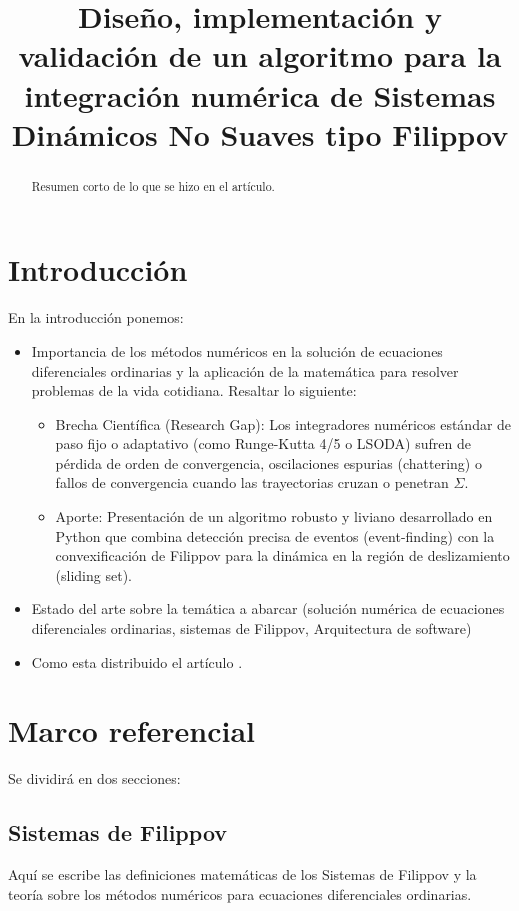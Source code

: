 \documentclass[12pt,letterpaper]{article}
\title{Diseño, implementación y validación de un algoritmo para la integración numérica de Sistemas Dinámicos No Suaves tipo Filippov }
\date{}
\begin{document}
\maketitle

\begin{abstract}
    Resumen corto de lo que se hizo en el artículo.
\end{abstract}

\section{Introducción}
En la introducción ponemos:
\begin{itemize}
    \item Importancia de los métodos numéricos en la solución de ecuaciones diferenciales ordinarias y la aplicación de la matemática para resolver problemas de la vida cotidiana. Resaltar lo siguiente:
    \begin{itemize}
        \item Brecha Científica (Research Gap): Los integradores numéricos estándar de paso fijo o adaptativo (como Runge-Kutta 4/5 o LSODA) sufren de pérdida de orden de convergencia, oscilaciones espurias (chattering) o fallos de convergencia cuando las trayectorias cruzan o penetran $\Sigma$.
        \item Aporte: Presentación de un algoritmo robusto y liviano desarrollado en Python que combina detección precisa de eventos (event-finding) con la convexificación de Filippov para la dinámica en la región de deslizamiento (sliding set).
    \end{itemize}
    \item Estado del arte sobre la temática a abarcar (solución numérica de ecuaciones diferenciales ordinarias, sistemas de Filippov, Arquitectura de software)
    \item Como esta distribuido el artículo \cite{wang2025filippov}.
\end{itemize}

\section{Marco referencial}
Se dividirá en dos secciones:
\subsection{Sistemas de Filippov}
Aquí se escribe las definiciones matemáticas de los Sistemas de Filippov y la teoría sobre los métodos numéricos para ecuaciones diferenciales ordinarias.
\end{document}
